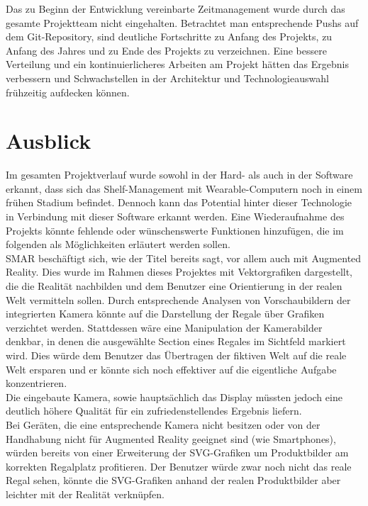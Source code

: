Das zu Beginn der Entwicklung vereinbarte Zeitmanagement wurde durch das gesamte Projektteam nicht eingehalten. Betrachtet man entsprechende Pushs auf dem Git-Repository, sind deutliche Fortschritte zu Anfang des Projekts, zu Anfang des Jahres und zu Ende des Projekts zu verzeichnen. Eine bessere Verteilung und ein kontinuierlicheres Arbeiten am Projekt hätten das Ergebnis verbessern und Schwachstellen in der Architektur und Technologieauswahl frühzeitig aufdecken können.

\chapter{Ausblick}
\label{cha:ausblick}
Im gesamten Projektverlauf wurde sowohl in der Hard- als auch in der Software erkannt, dass sich das Shelf-Management mit Wearable-Computern noch in einem frühen Stadium befindet. Dennoch kann das Potential hinter dieser Technologie in Verbindung mit dieser Software erkannt werden. Eine Wiederaufnahme des Projekts könnte fehlende oder wünschenswerte Funktionen hinzufügen, die im folgenden als Möglichkeiten erläutert werden sollen.\\

\ac{SMAR} beschäftigt sich, wie der Titel bereits sagt, vor allem auch mit Augmented Reality. Dies wurde im Rahmen dieses Projektes mit Vektorgrafiken dargestellt, die die Realität nachbilden und dem Benutzer eine Orientierung in der realen Welt vermitteln sollen. Durch entsprechende Analysen von Vorschaubildern der integrierten Kamera könnte auf die Darstellung der Regale über Grafiken verzichtet werden. Stattdessen wäre eine Manipulation der Kamerabilder denkbar, in denen die ausgewählte Section eines Regales im Sichtfeld markiert wird. Dies würde dem Benutzer das Übertragen der fiktiven Welt auf die reale Welt ersparen und er könnte sich noch effektiver auf die eigentliche Aufgabe konzentrieren.\\
Die eingebaute Kamera, sowie hauptsächlich das Display müssten jedoch eine deutlich höhere Qualität für ein zufriedenstellendes Ergebnis liefern.\\
Bei Geräten, die eine entsprechende Kamera nicht besitzen oder von der Handhabung nicht für Augmented Reality geeignet sind (wie \zB Smartphones), würden bereits von einer Erweiterung der SVG-Grafiken um Produktbilder am korrekten Regalplatz profitieren. Der Benutzer würde zwar noch nicht das reale Regal sehen, könnte die SVG-Grafiken anhand der realen Produktbilder aber leichter mit der Realität verknüpfen.\\

